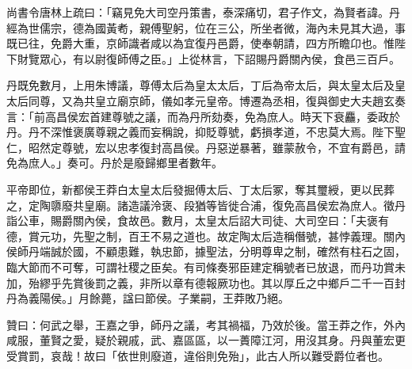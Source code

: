 \begin{pinyinscope}
尚書令唐林上疏曰：「竊見免大司空丹策書，泰深痛切，君子作文，為賢者諱。丹經為世儒宗，德為國黃耇，親傅聖躬，位在三公，所坐者微，海內未見其大過，事既已往，免爵大重，京師識者咸以為宜復丹邑爵，使奉朝請，四方所瞻卬也。惟陛下財覽眾心，有以尉復師傅之臣。」上從林言，下詔賜丹爵關內侯，食邑三百戶。

丹既免數月，上用朱博議，尊傅太后為皇太太后，丁后為帝太后，與太皇太后及皇太后同尊，又為共皇立廟京師，儀如孝元皇帝。博遷為丞相，復與御史大夫趙玄奏言：「前高昌侯宏首建尊號之議，而為丹所劾奏，免為庶人。時天下衰麤，委政於丹。丹不深惟褒廣尊親之義而妄稱說，抑貶尊號，虧損孝道，不忠莫大焉。陛下聖仁，昭然定尊號，宏以忠孝復封高昌侯。丹惡逆暴著，雖蒙赦令，不宜有爵邑，請免為庶人。」奏可。丹於是廢歸鄉里者數年。

平帝即位，新都侯王莽白太皇太后發掘傅太后、丁太后冢，奪其璽綬，更以民葬之，定陶隳廢共皇廟。諸造議泠褒、段猶等皆徙合浦，復免高昌侯宏為庶人。徵丹詣公車，賜爵關內侯，食故邑。數月，太皇太后詔大司徒、大司空曰：「夫褒有德，賞元功，先聖之制，百王不易之道也。故定陶太后造稱僭號，甚悖義理。關內侯師丹端誠於國，不顧患難，執忠節，據聖法，分明尊卑之制，確然有柱石之固，臨大節而不可奪，可謂社稷之臣矣。有司條奏邪臣建定稱號者已放退，而丹功賞未加，殆繆乎先賞後罰之義，非所以章有德報厥功也。其以厚丘之中鄉戶二千一百封丹為義陽侯。」月餘薨，諡曰節侯。子業嗣，王莽敗乃絕。

贊曰：何武之舉，王嘉之爭，師丹之議，考其禍福，乃效於後。當王莽之作，外內咸服，董賢之愛，疑於親戚，武、嘉區區，以一蕢障江河，用沒其身。丹與董宏更受賞罰，哀哉！故曰「依世則廢道，違俗則免殆」，此古人所以難受爵位者也。


\end{pinyinscope}